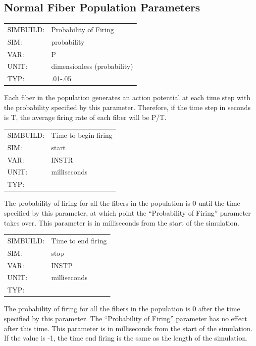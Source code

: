 \documentclass[12pt,openany,oneside]{book}
\newcommand{\inquotes}[1]{{{``#1''}}}
\begin{document}
\subsection{Normal Fiber Population Parameters}
\label{Normal Fiber Parameters}
\begin{flushleft}
\begin{tabular}{@{}ll@{}}
SIMBUILD: & Probability of Firing\\
SIM: & probability\\
VAR: & P\\
UNIT: & dimensionless (probability)\\
TYP: & .01-.05\\
\end{tabular}
\end{flushleft}
\noindent
Each fiber in the population generates an action potential at each
time step with the probability specified by this parameter.
Therefore, if the time step in seconds is T, the average firing rate
of each fiber will be P/T.
\filbreak
\vspace{\baselineskip}

\begin{flushleft}
\begin{tabular}{@{}ll@{}}
SIMBUILD: & Time to begin firing\\
SIM: & start\\
VAR: & INSTR\\
UNIT: & milliseconds\\
TYP: &\\
\end{tabular}
\end{flushleft}
\noindent
The probability of firing for all the fibers in the population is 0
until the time specified by this parameter, at which point the
\inquotes{Probability of Firing} parameter takes over. This parameter is in
milliseconds from the start of the simulation.
\filbreak
\vspace{\baselineskip}

\begin{flushleft}
\begin{tabular}{@{}ll@{}}
SIMBUILD: & Time to end firing\\
SIM: & stop\\
VAR: & INSTP\\
UNIT: & milliseconds\\
TYP: &\\
\end{tabular}
\end{flushleft}
The probability of firing for all the fibers in the population is 0
after the time specified by this parameter. The \inquotes{Probability of
Firing} parameter has no effect after this time. This parameter is
in milliseconds from the start of the simulation. If the value is -1, the
time end firing is the same as the length of the simulation.
\noindent
\filbreak
\vspace{\baselineskip}
\end{document}
